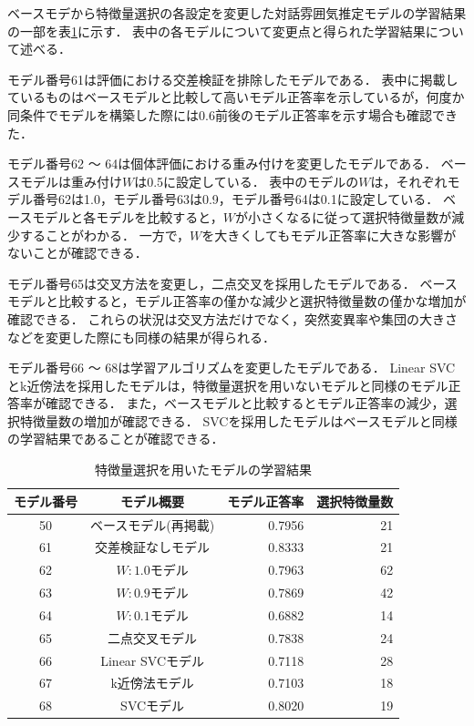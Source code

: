 ベースモデから特徴量選択の各設定を変更した対話雰囲気推定モデルの学習結果の一部を表\ref{tab:learn_result_with_ga_change_params}に示す．
表中の各モデルについて変更点と得られた学習結果について述べる．

モデル番号61は評価における交差検証を排除したモデルである．
表中に掲載しているものはベースモデルと比較して高いモデル正答率を示しているが，何度か同条件でモデルを構築した際には0.6前後のモデル正答率を示す場合も確認できた．

モデル番号62 〜 64は個体評価における重み付けを変更したモデルである．
ベースモデルは重み付け$W$は0.5に設定している．
表中のモデルの$W$は，それぞれモデル番号62は1.0，モデル番号63は0.9，モデル番号64は0.1に設定している．
ベースモデルと各モデルを比較すると，$W$が小さくなるに従って選択特徴量数が減少することがわかる．
一方で，$W$を大きくしてもモデル正答率に大きな影響がないことが確認できる．

モデル番号65は交叉方法を変更し，二点交叉を採用したモデルである．
ベースモデルと比較すると，モデル正答率の僅かな減少と選択特徴量数の僅かな増加が確認できる．
これらの状況は交叉方法だけでなく，突然変異率や集団の大きさなどを変更した際にも同様の結果が得られる．

モデル番号66 〜 68は学習アルゴリズムを変更したモデルである．
Linear SVCとk近傍法を採用したモデルは，特徴量選択を用いないモデルと同様のモデル正答率が確認できる．
また，ベースモデルと比較するとモデル正答率の減少，選択特徴量数の増加が確認できる．
SVCを採用したモデルはベースモデルと同様の学習結果であることが確認できる．

\begin{table}[t]
    \caption{特徴量選択を用いたモデルの学習結果}
    \centering
    \begin{tabular}{|c|c|r|r|}
        \hline
        モデル番号 & モデル概要 & モデル正答率 & 選択特徴量数 \\
        \hline\hline
        50 & ベースモデル(再掲載) & 0.7956 & 21 \\ \hline
        61 & 交差検証なしモデル & 0.8333 & 21 \\ \hline
        62 & $W:1.0$モデル & 0.7963 & 62 \\ \hline
        63 & $W:0.9$モデル & 0.7869 & 42 \\ \hline
        64 & $W:0.1$モデル & 0.6882 & 14 \\ \hline
        65 & 二点交叉モデル & 0.7838 & 24 \\ \hline
        66 & Linear SVCモデル & 0.7118 & 28 \\ \hline
        67 & k近傍法モデル & 0.7103 & 18 \\ \hline
        68 & SVCモデル & 0.8020 & 19 \\ \hline
    \end{tabular}
    \label{tab:learn_result_with_ga_change_params}
\end{table}

